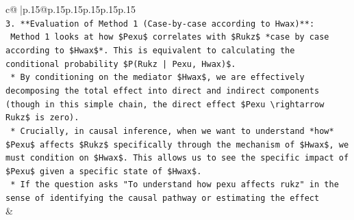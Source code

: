 \documentclass{article}
\begin{document}
{\begin{supertabular}{c@{$\;$}|p{.15\linewidth}@{}p{.15\linewidth}p{.15\linewidth}p{.15\linewidth}p{.15\linewidth}p{.15\linewidth}}
{{{\\ 
\texttt{3.  **Evaluation of Method 1 (Case{-}by{-}case according to Hwax)**:} \\
\texttt{    Method 1 looks at how \$Pexu\$ correlates with \$Rukz\$ *case by case according to \$Hwax\$*. This is equivalent to calculating the conditional probability \$P(Rukz | Pexu, Hwax)\$.} \\
\texttt{    *   By conditioning on the mediator \$Hwax\$, we are effectively decomposing the total effect into direct and indirect components (though in this simple chain, the direct effect \$Pexu \textbackslash{}rightarrow Rukz\$ is zero).} \\
\texttt{    *   Crucially, in causal inference, when we want to understand *how* \$Pexu\$ affects \$Rukz\$ specifically through the mechanism of \$Hwax\$, we must condition on \$Hwax\$. This allows us to see the specific impact of \$Pexu\$ given a specific state of \$Hwax\$.} \\
\texttt{    *   If the question asks "To understand how pexu affects rukz" in the sense of identifying the causal pathway or estimating the effect} \\
            }
        }
    }
    & \\ \\


\end{supertabular}}
\end{document}
